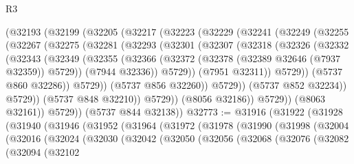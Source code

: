 \begin{lexlean}{R3}
\begin{coremodule}
          (@32193
            (@32199
              (@32205
                (@32217
                  (@32223
                    (@32229
                      (@32241
                        (@32249
                          (@32255
                            (@32267
                              (@32275
                                (@32281
                                  (@32293
                                    (@32301
                                      (@32307
                                        (@32318
                                          (@32326
                                            (@32332
                                              (@32343
                                                (@32349
                                                  (@32355
                                                    (@32366
                                                      (@32372
                                                        (@32378
                                                          (@32389 @32646 (@7937 @32359))
                                                          @5729))
                                                      (@7944 @32336))
                                                    @5729))
                                                (@7951 @32311))
                                              @5729))
                                          (@5737 @860 @32286))
                                        @5729))
                                    (@5737 @856 @32260))
                                  @5729))
                              (@5737 @852 @32234))
                            @5729))
                        (@5737 @848 @32210))
                      @5729))
                  (@8056 @32186))
                @5729))
            (@8063 @32161))
          @5729))
      (@5737 @844 @32138))
@32773 := @31916
    (@31922
      (@31928
        (@31940
          (@31946
            (@31952
              (@31964
                (@31972
                  (@31978
                    (@31990
                      (@31998
                        (@32004
                          (@32016
                            (@32024
                              (@32030
                                (@32042
                                  (@32050
                                    (@32056
                                      (@32068
                                        (@32076
                                          (@32082
                                            (@32094
                                              (@32102

\end{coremodule}
\end{lexlean}
